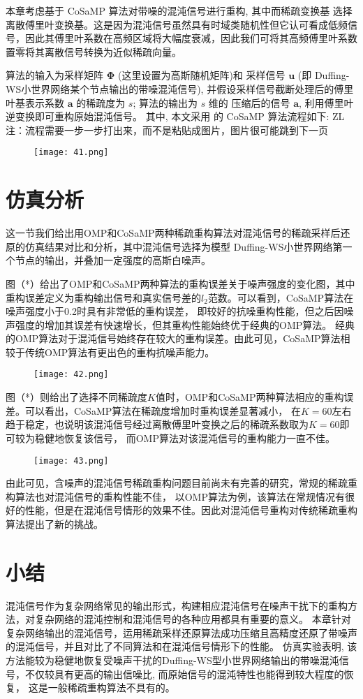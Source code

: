本章考虑基于 CoSaMP 算法对带噪的混沌信号进行重构, 其中而稀疏变换基 选择离散傅里叶变换基。这是因为混沌信号虽然具有时域类随机性但它认可看成低频信号，因此其傅里叶系数在高频区域将大幅度衰减，因此我们可将其高频傅里叶系数置零将其离散信号转换为近似稀疏向量。

算法的输入为采样矩阵 $\boldsymbol{\Phi}$ (这里设置为高斯随机矩阵)和 采样信号 $\boldsymbol{u}$
(即 Duffing-WS小世界网络某个节点输出的带噪混沌信号), 并假设采样信号截断处理后的傅里叶基表示系数 $\boldsymbol{a}$
的稀疏度为 $s$; 算法的输出为 $s$ 维的 压缩后的信号 $\boldsymbol{a}$, 利用傅里叶逆变换即可重构原始混沌信号。
其中, 本文采用 的 CoSaMP 算法流程如下: \textcolor[rgb]{0.00,0.00,1.00}{ZL注：流程需要一步一步打出来，而不是粘贴成图片，图片很可能跳到下一页}
\begin{figure}[!htbp]
    \centering
    \texttt{[image: 41.png]}
\end{figure}

\section{仿真分析}
这一节我们给出用OMP和CoSaMP两种稀疏重构算法对混沌信号的稀疏采样后还原的仿真结果对比和分析，其中混沌信号选择为模型
Duffing-WS小世界网络第一个节点的输出，并叠加一定强度的高斯白噪声。

图（*）给出了OMP和CoSaMP两种算法的重构误差关于噪声强度的变化图，其中重构误差定义为重构输出信号和真实信号差的$l_2$范数。可以看到，CoSaMP算法在噪声强度小于0.2时具有非常低的重构误差，
即较好的抗噪重构性能，但之后因噪声强度的增加其误差有快速增长，但其重构性能始终优于经典的OMP算法。
经典的OMP算法对于混沌信号始终存在较大的重构误差。由此可见，CoSaMP算法相较于传统OMP算法有更出色的重构抗噪声能力。
\begin{figure}[!htbp]
    \centering
    \texttt{[image: 42.png]}
\end{figure}

图（*）则给出了选择不同稀疏度$K$值时，OMP和CoSaMP两种算法相应的重构误差。可以看出，CoSaMP算法在稀疏度增加时重构误差显著减小，
在$K = 60$左右趋于稳定，也说明该混沌信号经过离散傅里叶变换之后的稀疏系数取为$K = 60$即可较为稳健地恢复该信号，
而OMP算法对该混沌信号的重构能力一直不佳。

\begin{figure}[!htbp]
    \centering
    \texttt{[image: 43.png]}
\end{figure}
由此可见，含噪声的混沌信号稀疏重构问题目前尚未有完善的研究，常规的稀疏重构算法也对混沌信号的重构性能不佳，
以OMP算法为例，该算法在常规情况有很好的性能，但是在混沌信号情形的效果不佳。因此对混沌信号重构对传统稀疏重构算法提出了新的挑战。
\section{小结}
混沌信号作为复杂网络常见的输出形式，构建相应混沌信号在噪声干扰下的重构方法，对复杂网络的混沌控制和混沌信号的各种应用都具有重要的意义。
本章针对复杂网络输出的混沌信号，运用稀疏采样还原算法成功压缩且高精度还原了带噪声的混沌信号，并且对比了不同算法和在混沌信号情形下的性能。
仿真实验表明, 该方法能较为稳健地恢复受噪声干扰的Duffing-WS型小世界网络输出的带噪混沌信号，不仅较具有更高的输出信噪比, 而原始信号的混沌特性也能得到较大程度的恢复，
这是一般稀疏重构算法不具有的。